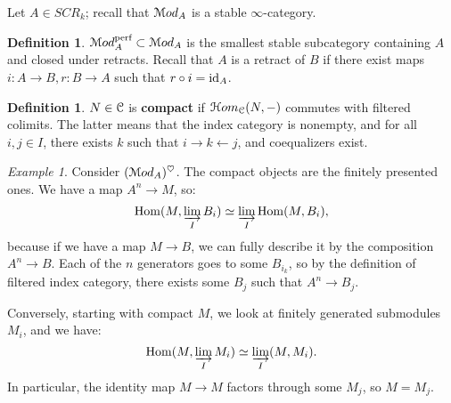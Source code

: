 \documentclass[10pt,a4paper,reqno,oneside]{book} %
\theoremstyle{plain}
\theoremstyle{definition}
\newtheorem{defin}[thm]{Definition}
\theoremstyle{remark}
\newtheorem{eg}[thm]{Example}
\numberwithin{equation}{section}
\begin{document}
Let $A \in SCR_k$; recall that $\mathcal M od_A$ is a stable $\infty$-category.

\begin{defin}
$\mathcal M od^{\text{perf}}_A \subset \mathcal M od_A$ is the smallest stable subcategory containing $A$ and closed under retracts.
Recall that $A$ is a retract of $B$ if there exist maps $i:A \to B, r:B \to A$ such that $r\circ i = \mathrm{id}_A$.
\end{defin}

\begin{defin}
$N \in \mathcal C$ is \textbf{compact} if $\mathcal H om_{\mathcal C}(N, -)$ commutes with filtered colimits. The latter means that
the index category is nonempty, and for all $i,j \in I$, there exists $k$ such that $i \to k \leftarrow j$, and
coequalizers exist.
\end{defin}

\begin{eg}
Consider $(\mathcal M od_A)^{\heartsuit}$. The compact objects are the finitely presented ones. We have a map $A^n \to M$,
so:
\[	\operatorname{Hom}(M, \varinjlim_I B_i) \simeq \varinjlim_I \operatorname{Hom}(M,B_i),	\]
because if we have a map $M \to B$, we can fully describe it by the composition $A^n \to B$. Each of the $n$ generators goes
to some $B_{i_k}$, so by the definition of filtered index category, there exists some $B_j$ such that $A^n \to B_j$. 

Conversely, starting with compact $M$, we look at finitely generated submodules $M_i$, and we have:
\[	\operatorname{Hom}(M, \varinjlim_I M_i) \simeq \varinjlim_I(M,M_i).	\]
In particular, the identity map $M \to M$ factors through some $M_j$, so $M = M_j$.
\end{eg}
\end{document}
